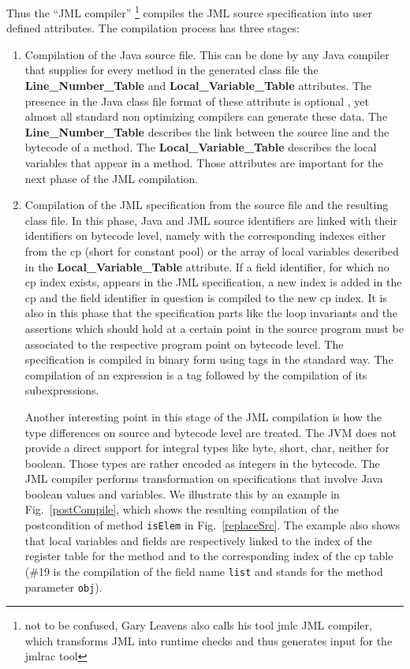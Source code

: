 Thus the ``JML compiler'' \footnote{not to be confused, Gary Leavens also calls his tool jmlc JML compiler, which transforms JML into runtime checks and thus generates input for the jmlrac tool  } compiles the JML source specification into user defined attributes. The compilation process has three stages:
\begin{enumerate}
\item Compilation of the Java source file. This can be done by any Java compiler that supplies for every method in the generated class file 
the \textbf{Line\_Number\_Table} and \textbf{Local\_Variable\_Table}  attributes. The presence in the Java class file format of 
these attribute is optional \cite{VMSpec}, yet almost all standard non optimizing compilers can generate these data. 
The \textbf{Line\_Number\_Table} describes the link between the source line and the bytecode of a method.  
The \textbf{Local\_Variable\_Table} describes the local variables that appear in a method. 
Those attributes are important for the next phase of the JML compilation.
\item Compilation of the JML specification from the source file and the resulting class file. In this phase, Java and JML source identifiers are 
linked with their identifiers on bytecode level, namely with the corresponding indexes either from the cp (short for constant pool) or the array of 
local variables described in the \textbf{Local\_Variable\_Table} attribute. If a field
identifier, for which no cp index exists, appears in the JML specification, a new index is added in the cp and the field identifier in question
is compiled to the new cp index. It is also in this phase that the specification parts like the loop invariants and the assertions which should hold at a certain point in the source program must be associated to the respective program point on bytecode level. The specification
is compiled in binary form using tags in the standard way. The compilation of an expression is a tag followed by the compilation of its subexpressions. 

Another interesting point in this stage of the JML compilation is how the type differences on source and bytecode level are treated. 
The JVM does not provide a direct support for integral types like byte, short, char, neither for boolean.
 Those types are rather encoded as integers in the bytecode. The JML compiler performs transformation on specifications that involve Java boolean values and variables.
 We illustrate this by an example in Fig.~\ref{postCompile}, which shows the resulting compilation of the postcondition of method \texttt{isElem} in Fig.~\ref{replaceSrc}. The example also shows that local variables and  fields are respectively linked to the index of the register table for the method and to the corresponding index of the cp table  (\#19 is the compilation of the field name \texttt{list} and  stands for the method parameter \texttt{obj}). 


\end{enumerate}
